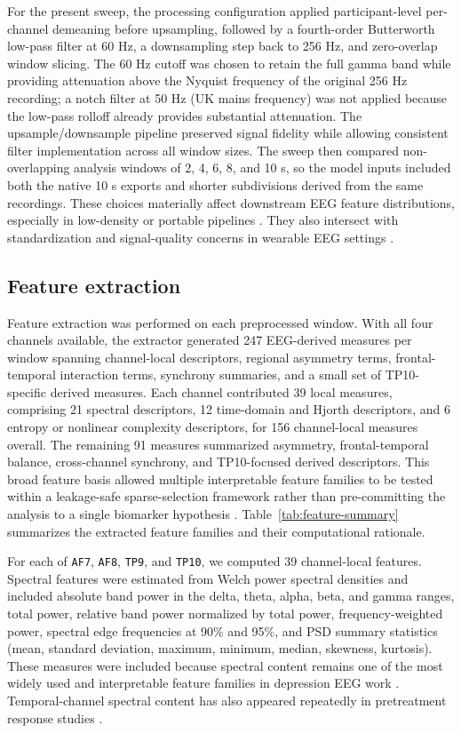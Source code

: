 For the present sweep, the processing configuration applied participant-level per-channel demeaning before upsampling, followed by a fourth-order Butterworth low-pass filter at 60 Hz, a downsampling step back to 256 Hz, and zero-overlap window slicing. The 60 Hz cutoff was chosen to retain the full gamma band while providing attenuation above the Nyquist frequency of the original 256 Hz recording; a notch filter at 50 Hz (UK mains frequency) was not applied because the low-pass rolloff already provides substantial attenuation. The upsample/downsample pipeline preserved signal fidelity while allowing consistent filter implementation across all window sizes. The sweep then compared non-overlapping analysis windows of 2, 4, 6, 8, and 10 s, so the model inputs included both the native 10 s exports and shorter subdivisions derived from the same recordings. These choices materially affect downstream EEG feature distributions, especially in low-density or portable pipelines \citep{Miranda2019,Siuly2017,Mahato2020}. They also intersect with standardization and signal-quality concerns in wearable EEG settings \citep{simmatis2023_technical,babiloni2012_guidelines}. 

\subsection{Feature extraction}

Feature extraction was performed on each preprocessed window. With all four channels available, the extractor generated 247 EEG-derived measures per window spanning channel-local descriptors, regional asymmetry terms, frontal-temporal interaction terms, synchrony summaries, and a small set of TP10-specific derived measures. Each channel contributed 39 local measures, comprising 21 spectral descriptors, 12 time-domain and Hjorth descriptors, and 6 entropy or nonlinear complexity descriptors, for 156 channel-local measures overall. The remaining 91 measures summarized asymmetry, frontal-temporal balance, cross-channel synchrony, and TP10-focused derived descriptors. This broad feature basis allowed multiple interpretable feature families to be tested within a leakage-safe sparse-selection framework rather than pre-committing the analysis to a single biomarker hypothesis \citep{Shen2025,Zhang2023EEGMethods}. Table~\ref{tab:feature-summary} summarizes the extracted feature families and their computational rationale.

For each of \texttt{AF7}, \texttt{AF8}, \texttt{TP9}, and \texttt{TP10}, we computed 39 channel-local features. Spectral features were estimated from Welch power spectral densities \citep{Welch1967} and included absolute band power in the delta, theta, alpha, beta, and gamma ranges, total power, relative band power normalized by total power, frequency-weighted power, spectral edge frequencies at 90\% and 95\%, and PSD summary statistics (mean, standard deviation, maximum, minimum, median, skewness, kurtosis). These measures were included because spectral content remains one of the most widely used and interpretable feature families in depression EEG work \citep{olbrich2013_eeg,Mahato2020,Mumtaz2017}. Temporal-channel spectral content has also appeared repeatedly in pretreatment response studies \citep{Jaworska2018}.

